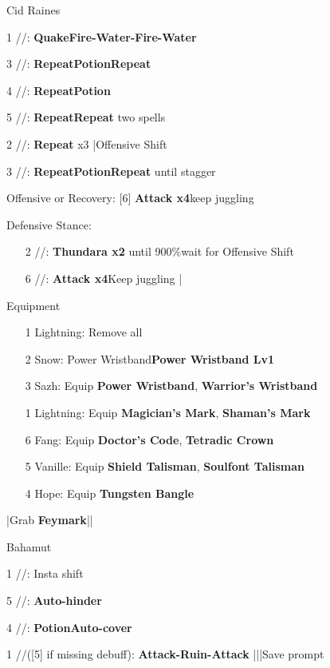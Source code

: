 \begin{fight}{Cid Raines}
	\item [1] \rav/\sen/\syn: \textbf{Quake}\to \textbf{Fire-Water-Fire-Water}
	\item [3] \rav/\sen/\rav: \textbf{Repeat}\to \textbf{Potion}\to \textbf{Repeat}
	\item [4] \rav/\sen/\rav: \textbf{Repeat}\to \textbf{Potion}
	\item [5] \rav/\rav/\syn: \textbf{Repeat}\to \textbf{Repeat} two spells
	\item [2] \rav/\rav/\rav: \textbf{Repeat} x3 |Offensive Shift
	\item [3] \rav/\sen/\rav: \textbf{Repeat}\to \textbf{Potion}\to \textbf{Repeat} until stagger
	\item Offensive or Recovery: [6] \textbf{Attack x4}\to keep juggling
	\item Defensive Stance:
	\begin{itemize}
		\item [2] \rav/\rav/\rav: \textbf{Thundara x2} until 900\%\to wait for Offensive Shift
		\item [6] \com/\com/\rav: \textbf{Attack x4}\to Keep juggling |\skip
	\end{itemize}
\end{fight}
\begin{menu}
	\item Equipment
	\begin{itemize}
		\item [1] Lightning: Remove all
		\item [2] Snow: Power Wristband\star \to \textbf{Power Wristband Lv1}
		\item [3] Sazh: Equip \textbf{Power Wristband\star}, \textbf{Warrior's Wristband}
		\item [1] Lightning: Equip \textbf{Magician's Mark}, \textbf{Shaman's Mark}
		\item [6] Fang: Equip \textbf{Doctor's Code}, \textbf{Tetradic Crown}
		\item [5] Vanille: Equip \textbf{Shield Talisman}, \textbf{Soulfont Talisman}
		\item [4] Hope: Equip \textbf{Tungsten Bangle}
	\end{itemize}
\end{menu}
\begin{mainlist}
	\item \skip|Grab \textbf{Feymark}|\skip|
\end{mainlist}
\begin{fight}{Bahamut}
	\item [1] \com/\rav/\rav: Insta shift
	\item [5] \sab/\com/\rav: \textbf{Auto-hinder}
	\item [4] \sen/\med/\med: \textbf{Potion}\to \textbf{Auto-cover}
	\item [1] \com/\rav/\rav ([5] if missing debuff): \textbf{Attack-Ruin-Attack} |\skip||Save prompt
\end{fight}
